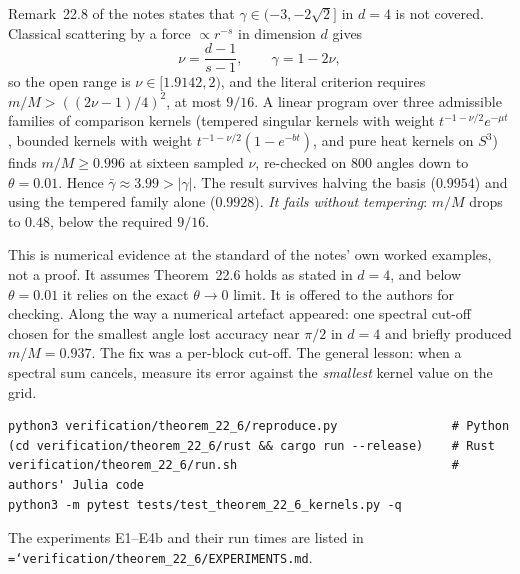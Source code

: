 \documentclass[11pt,a4paper,openany]{book}
\newcommand{\code}[1]{\texttt{\hyphenchar\font=`\-\relax #1}}
\theoremstyle{definition}
\theoremstyle{plain}
\begin{document}
Remark~22.8 of the notes states that $\gamma\in(-3,-2\sqrt2]$ in $d=4$ is not covered. Classical
scattering by a force $\propto r^{-s}$ in dimension $d$ gives
\[
  \nu=\frac{d-1}{s-1},\qquad\gamma=1-2\nu,
\]
so the open range is $\nu\in[1.9142,2)$, and the literal criterion requires
$m/M>((2\nu-1)/4)^2$, at most $9/16$. A linear program over three admissible families of
comparison kernels (tempered singular kernels with weight $t^{-1-\nu/2}e^{-\mu t}$, bounded
kernels with weight $t^{-1-\nu/2}(1-e^{-bt})$, and pure heat kernels on $S^3$) finds
$m/M\ge0.996$ at sixteen sampled $\nu$, re-checked on 800 angles down to $\theta=0.01$. Hence
$\bar\gamma\approx3.99>|\gamma|$. The result survives halving the basis ($0.9954$) and using the
tempered family alone ($0.9928$). \emph{It fails without tempering}: $m/M$ drops to $0.48$, below
the required $9/16$.

\begin{lesson}[How to read the $d=4$ result]
This is numerical evidence at the standard of the notes' own worked examples, not a proof. It
assumes Theorem~22.6 holds as stated in $d=4$, and below $\theta=0.01$ it relies on the exact
$\theta\to0$ limit. It is offered to the authors for checking. Along the way a numerical artefact
appeared: one spectral cut-off chosen for the smallest angle lost accuracy near $\pi/2$ in $d=4$
and briefly produced $m/M=0.937$. The fix was a per-block cut-off. The general lesson: when a
spectral sum cancels, measure its error against the \emph{smallest} kernel value on the grid.
\end{lesson}

\begin{runit}
\begin{verbatim}
python3 verification/theorem_22_6/reproduce.py                # Python
(cd verification/theorem_22_6/rust && cargo run --release)    # Rust
verification/theorem_22_6/run.sh                              # authors' Julia code
python3 -m pytest tests/test_theorem_22_6_kernels.py -q
\end{verbatim}
The experiments E1--E4b and their run times are listed in
\code{verification/theorem\_22\_6/EXPERIMENTS.md}.
\end{runit}
\end{document}
